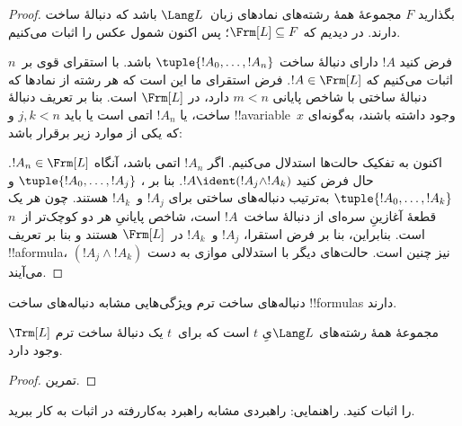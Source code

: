 \documentclass[../../../include/open-logic-section]{subfiles}
\begin{document}
\begin{proof}
بگذارید $F$ مجموعهٔ همهٔ رشته‌های نمادهای زبان~$\Lang L$ باشد که دنبالهٔ
ساخت دارند. در  دیدیم که
$\Frm[L] \subseteq F$؛ پس اکنون شمول عکس را اثبات می‌کنیم.

فرض کنید $!A$ دارای دنبالهٔ ساخت $\tuple{!A_0,\dotsc,!A_n}$ باشد.
با استقرای قوی بر~$n$ اثبات می‌کنیم که $!A \in \Frm[L]$.
فرض استقرای ما این است که هر رشته از نمادها که دنبالهٔ ساختی با شاخص پایانی
$m < n$ دارد، در $\Frm[L]$ است.
بنا بر تعریف دنبالهٔ ساخت، یا $!A_n$ اتمی است یا باید $j,k < n$ و
!!a{variable}~$x$ وجود داشته باشند، به‌گونه‌ای که یکی از موارد زیر برقرار
باشد:
\begin{enumerate}
\end{enumerate}
اکنون به تفکیک حالت‌ها استدلال می‌کنیم. اگر $!A_n$ اتمی باشد، آنگاه
$!A_n \in \Frm[L]$. حال فرض کنید
$!A \ident (!A_j \land !A_k)$. بنا بر
،
$\tuple{!A_0,\dotsc,!A_j}$ و $\tuple{!A_0,\dotsc,!A_k}$ به‌ترتیب
دنباله‌های ساختی برای $!A_j$ و~$!A_k$ هستند. چون هر یک قطعهٔ آغازینِ سره‌ای
از دنبالهٔ ساخت~$!A$ است، شاخص پایانیِ هر دو کوچک‌تر از~$n$ است. بنابراین،
بنا بر فرض استقرا، $!A_j$ و~$!A_k$ در~$\Frm[L]$ هستند و بنا بر تعریف
!!a{formula}، $(!A_j \land !A_k)$ نیز چنین است. حالت‌های دیگر با
استدلالی موازی به دست می‌آیند.
\end{proof}

دنباله‌های ساخت ترم ویژگی‌هایی مشابه دنباله‌های ساخت !!{formula}s دارند.

\begin{prop}
$\Trm[L]$ مجموعهٔ همهٔ رشته‌های $\Lang L$یِ $t$ است که برای~$t$ یک
دنبالهٔ ساخت ترم وجود دارد.
\end{prop}

\begin{proof}
تمرین.
\end{proof}

\begin{prob}
 را اثبات کنید.
راهنمایی: راهبردی مشابه راهبرد به‌کاررفته در اثبات
 به کار ببرید.
\end{prob}
\end{document}
